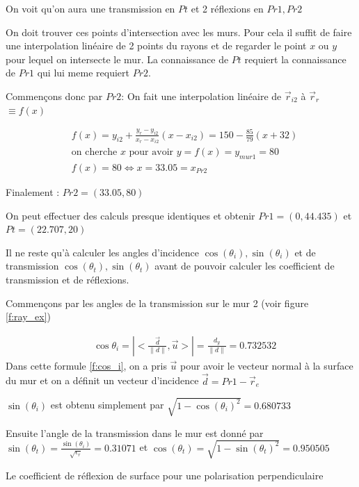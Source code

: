 \documentclass[sn-mathphys-num]{sn-jnl}%
\theoremstyle{thmstyleone}%
\theoremstyle{thmstyletwo}%
\theoremstyle{thmstylethree}%
\begin{document}
On voit qu'on aura une transmission en $Pt$ et 2 réflexions en $Pr1, Pr2$

On doit trouver ces points d'intersection avec les murs.
Pour cela il suffit de faire une interpolation linéaire de 2 points du rayons
et de regarder le point $x$ ou $y$ pour lequel on intersecte le mur.
La connaissance de $Pt$ requiert la connaissance de $Pr1$ qui lui meme requiert $Pr2$.

Commençons donc par $Pr2$:
On fait une interpolation linéaire de $\vec{r}_{i2}$ à $\vec{r}_{r}$ $\equiv f(x)$

\begin{align*}
    &f(x) = y_{i2} + \frac{y_r - y_{i2}}{x_r - x_{i2}}(x - x_{i2})
    = 150 - \frac{85}{79}(x + 32)\\
    &\textrm{on cherche $x$ pour avoir $y=f(x)=y_{mur1}=80$}\\
    &f(x) = 80 \iff x = 33.05 = x_{Pr2}
\end{align*}

Finalement : $Pr2 = (33.05, 80)$

On peut effectuer des calculs presque identiques et obtenir $Pr1 = (0, 44.435)$ et $Pt = (22.707, 20)$

Il ne reste qu'à calculer les angles d'incidence $\cos(\theta_i), \sin(\theta_i)$ 
et de transmission $\cos(\theta_t), \sin(\theta_t)$
avant de pouvoir calculer les coefficient de transmission et de réflexions.

Commençons par les angles de la transmission sur le mur 2 (voir figure \ref{f:ray_ex})

\begin{equation}
\label{f:cos_i}
    \begin{aligned}
    & \cos \theta_i=\left|<\frac{\vec{d}}{\|d\|}, \vec{u}>\right|=\frac{d_y}{\|d\|}=0.732532
    \end{aligned}
\end{equation}
Dans cette formule \eqref{f:cos_i}, on a pris $\vec{u}$ pour avoir
le vecteur normal à la surface du mur et on a définit un vecteur
d'incidence $\vec{d} = Pr1 - \vec{r}_e$

$\sin(\theta_i)$ est obtenu simplement par $\sqrt{1 - \cos(\theta_i)^2} = 0.680733$

Ensuite l'angle de la transmission dans le mur est donné par $\sin(\theta_t) = \frac{\sin(\theta_i)}{\sqrt{\epsilon_r}} = 0.31071$
et $\cos(\theta_t) = \sqrt{1 - \sin(\theta_t)^2} = 0.950505$

Le coefficient de réflexion de surface pour une polarisation perpendiculaire
\end{document}
